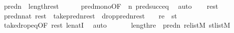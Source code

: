 \begin{isabellebody}
\ {\isachardoublequoteopen}pred{\isacharparenleft}{\kern0pt}n{\isacharparenright}{\kern0pt}\ {\isasymle}\ length{\isacharparenleft}{\kern0pt}rest{\isacharparenright}{\kern0pt}{\isachardoublequoteclose}\isanewline
\ \ \ \ \isamarkupfalse%
\ pred{\isacharunderscore}{\kern0pt}mono{\isacharbrackleft}{\kern0pt}OF\ {\isacharunderscore}{\kern0pt}\ {\isacartoucheopen}n{\isasymle}{\isacharunderscore}{\kern0pt}{\isacartoucheclose}{\isacharbrackright}{\kern0pt}\ pred{\isacharunderscore}{\kern0pt}succ{\isacharunderscore}{\kern0pt}eq\ \isamarkupfalse%
\ auto\isanewline
\ \ \isamarkupfalse%
\ {\isacartoucheopen}rest{\isasymin}{\isacharunderscore}{\kern0pt}{\isacartoucheclose}\isanewline
\ \ \isamarkupfalse%
\ {\isachardoublequoteopen}pred{\isacharparenleft}{\kern0pt}n{\isacharparenright}{\kern0pt}{\isasymin}nat{\isachardoublequoteclose}\ {\isachardoublequoteopen}rest\ {\isacharequal}{\kern0pt}\ take{\isacharparenleft}{\kern0pt}pred{\isacharparenleft}{\kern0pt}n{\isacharparenright}{\kern0pt}{\isacharcomma}{\kern0pt}rest{\isacharparenright}{\kern0pt}\ {\isacharat}{\kern0pt}\ drop{\isacharparenleft}{\kern0pt}pred{\isacharparenleft}{\kern0pt}n{\isacharparenright}{\kern0pt}{\isacharcomma}{\kern0pt}rest{\isacharparenright}{\kern0pt}{\isachardoublequoteclose}\ {\isacharparenleft}{\kern0pt}\ {\isachardoublequoteopen}{\isacharunderscore}{\kern0pt}\ {\isacharequal}{\kern0pt}\ {\isacharquery}{\kern0pt}re\ {\isacharat}{\kern0pt}\ {\isacharquery}{\kern0pt}st{\isachardoublequoteclose}{\isacharparenright}{\kern0pt}\isanewline
\ \ \ \ \isamarkupfalse%
\ take{\isacharunderscore}{\kern0pt}drop{\isacharunderscore}{\kern0pt}eq{\isacharbrackleft}{\kern0pt}OF\ {\isacartoucheopen}rest{\isasymin}{\isacharunderscore}{\kern0pt}{\isacartoucheclose}{\isacharbrackright}{\kern0pt}\ le{\isacharunderscore}{\kern0pt}natI\ \isamarkupfalse%
\ auto\isanewline
\ \ \isamarkupfalse%
\isanewline
\ \ \isamarkupfalse%
\ {\isachardoublequoteopen}length{\isacharparenleft}{\kern0pt}{\isacharquery}{\kern0pt}re{\isacharparenright}{\kern0pt}\ {\isacharequal}{\kern0pt}\ pred{\isacharparenleft}{\kern0pt}n{\isacharparenright}{\kern0pt}{\isachardoublequoteclose}\ {\isachardoublequoteopen}{\isacharquery}{\kern0pt}re{\isasymin}list{\isacharparenleft}{\kern0pt}M{\isacharparenright}{\kern0pt}{\isachardoublequoteclose}\ {\isachardoublequoteopen}{\isacharquery}{\kern0pt}st{\isasymin}list{\isacharparenleft}{\kern0pt}M{\isacharparenright}{\kern0pt}{\isachardoublequoteclose}\isanewline

\end{isabellebody}

